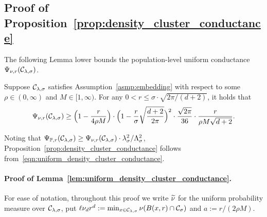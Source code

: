 \subsection{Proof of Proposition~\ref{prop:density_cluster_conductance}}
\label{subsec:density_cluster_conductance}
The following Lemma lower bounds the population-level uniform conductance $\Psi_{\nu,r}(\mathcal{C}_{\lambda,\sigma})$.
\begin{lemma}
	\label{lem:uniform_density_cluster_conductance}
	Suppose $\mathcal{C}_{\lambda,\sigma}$ satisfies Assumption~\ref{asmp:embedding} with respect to some $\rho \in (0,\infty)$ and $M \in [1,\infty)$. For any $0 < r \leq \sigma \cdot \sqrt{2\pi/(d + 2)}$, it holds that
	\begin{equation}
	\label{eqn:uniform_density_cluster_conductance}
	\Psi_{\nu,r}(\mathcal{C}_{\lambda,\sigma}) \geq \Bigl(1 - \frac{r}{4\rho M}\Bigr) \cdot \Bigl(1 - \frac{r}{\sigma}\sqrt{\frac{d + 2}{2\pi}}\Bigr)^2 \cdot \frac{\sqrt{2\pi}}{36} \cdot \frac{r}{\rho M \sqrt{d + 2}}.
	\end{equation}
\end{lemma}
Noting that $\Psi_{\mathbb{P},r}(\mathcal{C}_{\lambda,\sigma}) \geq \Psi_{\nu,r}(\mathcal{C}_{\lambda,\sigma}) \cdot \lambda_{\sigma}^2/\Lambda_{\sigma}^2$, Proposition~\ref{prop:density_cluster_conductance} follows from~\eqref{eqn:uniform_density_cluster_conductance}. 

\paragraph{Proof of Lemma~\ref{lem:uniform_density_cluster_conductance}.}
	For ease of notation, throughout this proof we write $\widetilde{\nu}$ for the uniform probability measure over $\mathcal{C}_{\lambda,\sigma}$, put $\ell \nu_d r^d := \min_{x \in \mathcal{C}_{\lambda,\sigma}}\nu(B(x,r) \cap \mathcal{C}_{\sigma})$ and $a := r/(2\rho M)$. 
	
